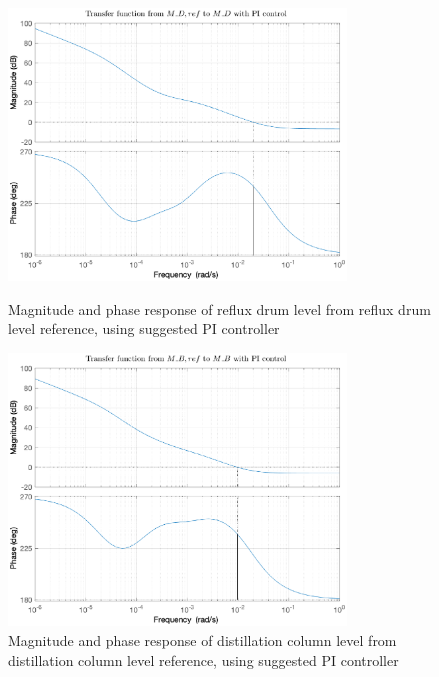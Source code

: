 \documentclass[12pt]{article}
\begin{document}
\begin{figure}
\centering
\includegraphics[width=0.8\textwidth]{../Systemanalyse/Log_Data_to_Matlab/Figurer/Identifisering/MD_PI_bode.eps}
\caption{Magnitude and phase response of reflux drum level from reflux drum level reference, using suggested PI controller}
\label{fig:L11_PI}

\includegraphics[width=0.8\textwidth]{../Systemanalyse/Log_Data_to_Matlab/Figurer/Identifisering/MB_PI_bode.eps}
\caption{Magnitude and phase response of distillation column level from distillation column level reference, using suggested PI controller}
\label{fig:L22_PI}
\end{figure}
\end{document}
